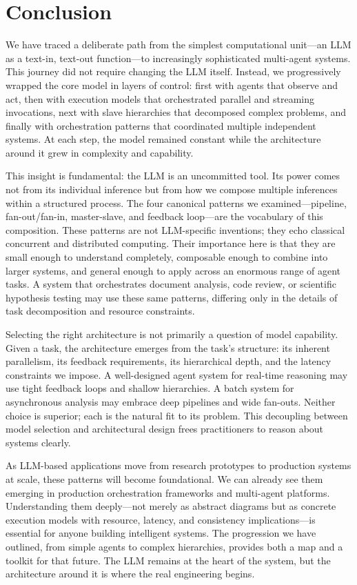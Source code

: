 \section{Conclusion}\label{sec:conclusion}

We have traced a deliberate path from the simplest computational unit—an LLM as a text-in, text-out function—to increasingly sophisticated multi-agent systems. This journey did not require changing the LLM itself. Instead, we progressively wrapped the core model in layers of control: first with agents that observe and act, then with execution models that orchestrated parallel and streaming invocations, next with slave hierarchies that decomposed complex problems, and finally with orchestration patterns that coordinated multiple independent systems. At each step, the model remained constant while the architecture around it grew in complexity and capability.

This insight is fundamental: the LLM is an uncommitted tool. Its power comes not from its individual inference but from how we compose multiple inferences within a structured process. The four canonical patterns we examined—pipeline, fan-out/fan-in, master-slave, and feedback loop—are the vocabulary of this composition. These patterns are not LLM-specific inventions; they echo classical concurrent and distributed computing. Their importance here is that they are small enough to understand completely, composable enough to combine into larger systems, and general enough to apply across an enormous range of agent tasks. A system that orchestrates document analysis, code review, or scientific hypothesis testing may use these same patterns, differing only in the details of task decomposition and resource constraints.

Selecting the right architecture is not primarily a question of model capability. Given a task, the architecture emerges from the task's structure: its inherent parallelism, its feedback requirements, its hierarchical depth, and the latency constraints we impose. A well-designed agent system for real-time reasoning may use tight feedback loops and shallow hierarchies. A batch system for asynchronous analysis may embrace deep pipelines and wide fan-outs. Neither choice is superior; each is the natural fit to its problem. This decoupling between model selection and architectural design frees practitioners to reason about systems clearly.

As LLM-based applications move from research prototypes to production systems at scale, these patterns will become foundational. We can already see them emerging in production orchestration frameworks and multi-agent platforms. Understanding them deeply—not merely as abstract diagrams but as concrete execution models with resource, latency, and consistency implications—is essential for anyone building intelligent systems. The progression we have outlined, from simple agents to complex hierarchies, provides both a map and a toolkit for that future. The LLM remains at the heart of the system, but the architecture around it is where the real engineering begins.
